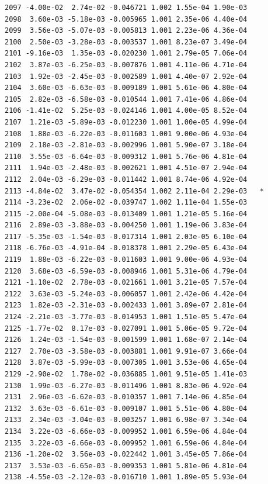 \documentclass[
  letterpaper,
  DIV=11,
  numbers=noendperiod]{scrartcl}
\begin{document}
\begin{verbatim}
2097 -4.00e-02  2.74e-02 -0.046721 1.002 1.55e-04 1.90e-03    
2098  3.60e-03 -5.18e-03 -0.005965 1.001 2.35e-06 4.40e-04    
2099  3.56e-03 -5.07e-03 -0.005813 1.001 2.23e-06 4.36e-04    
2100  2.50e-03 -3.28e-03 -0.003537 1.001 8.23e-07 3.49e-04    
2101 -9.16e-03  1.35e-03 -0.020230 1.001 2.79e-05 7.06e-04    
2102  3.87e-03 -6.25e-03 -0.007876 1.001 4.11e-06 4.71e-04    
2103  1.92e-03 -2.45e-03 -0.002589 1.001 4.40e-07 2.92e-04    
2104  3.60e-03 -6.63e-03 -0.009189 1.001 5.61e-06 4.80e-04    
2105  2.82e-03 -6.58e-03 -0.010544 1.001 7.41e-06 4.86e-04    
2106 -1.41e-02  5.25e-03 -0.024146 1.001 4.00e-05 8.52e-04    
2107  1.21e-03 -5.89e-03 -0.012230 1.001 1.00e-05 4.99e-04    
2108  1.88e-03 -6.22e-03 -0.011603 1.001 9.00e-06 4.93e-04    
2109  2.18e-03 -2.81e-03 -0.002996 1.001 5.90e-07 3.18e-04    
2110  3.55e-03 -6.64e-03 -0.009312 1.001 5.76e-06 4.81e-04    
2111  1.94e-03 -2.48e-03 -0.002621 1.001 4.51e-07 2.94e-04    
2112  2.04e-03 -6.29e-03 -0.011442 1.001 8.74e-06 4.92e-04    
2113 -4.84e-02  3.47e-02 -0.054354 1.002 2.11e-04 2.29e-03   *
2114 -3.23e-02  2.06e-02 -0.039747 1.002 1.11e-04 1.55e-03    
2115 -2.00e-04 -5.08e-03 -0.013409 1.001 1.21e-05 5.16e-04    
2116  2.89e-03 -3.88e-03 -0.004250 1.001 1.19e-06 3.83e-04    
2117 -5.35e-03 -1.54e-03 -0.017314 1.001 2.03e-05 6.10e-04    
2118 -6.76e-03 -4.91e-04 -0.018378 1.001 2.29e-05 6.43e-04    
2119  1.88e-03 -6.22e-03 -0.011603 1.001 9.00e-06 4.93e-04    
2120  3.68e-03 -6.59e-03 -0.008946 1.001 5.31e-06 4.79e-04    
2121 -1.10e-02  2.78e-03 -0.021661 1.001 3.21e-05 7.57e-04    
2122  3.63e-03 -5.24e-03 -0.006057 1.001 2.42e-06 4.42e-04    
2123  1.82e-03 -2.31e-03 -0.002433 1.001 3.89e-07 2.81e-04    
2124 -2.21e-03 -3.77e-03 -0.014953 1.001 1.51e-05 5.47e-04    
2125 -1.77e-02  8.17e-03 -0.027091 1.001 5.06e-05 9.72e-04    
2126  1.24e-03 -1.54e-03 -0.001599 1.001 1.68e-07 2.14e-04    
2127  2.70e-03 -3.58e-03 -0.003881 1.001 9.91e-07 3.66e-04    
2128  3.87e-03 -5.99e-03 -0.007305 1.001 3.53e-06 4.65e-04    
2129 -2.90e-02  1.78e-02 -0.036885 1.001 9.51e-05 1.41e-03    
2130  1.99e-03 -6.27e-03 -0.011496 1.001 8.83e-06 4.92e-04    
2131  2.96e-03 -6.62e-03 -0.010357 1.001 7.14e-06 4.85e-04    
2132  3.63e-03 -6.61e-03 -0.009107 1.001 5.51e-06 4.80e-04    
2133  2.34e-03 -3.04e-03 -0.003257 1.001 6.98e-07 3.34e-04    
2134  3.22e-03 -6.66e-03 -0.009952 1.001 6.59e-06 4.84e-04    
2135  3.22e-03 -6.66e-03 -0.009952 1.001 6.59e-06 4.84e-04    
2136 -1.20e-02  3.56e-03 -0.022442 1.001 3.45e-05 7.86e-04    
2137  3.53e-03 -6.65e-03 -0.009353 1.001 5.81e-06 4.81e-04    
2138 -4.55e-03 -2.12e-03 -0.016710 1.001 1.89e-05 5.93e-04    

\end{verbatim}
\end{document}
